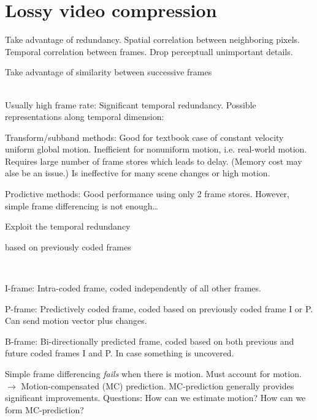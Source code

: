 \section{Lossy video compression}
Take advantage of redundancy. Spatial correlation between neighboring pixels. Temporal correlation between frames. Drop perceptuall unimportant details.
\begin{compactdesc}
	\item[\lp{Temporal Redundancy}] Take advantage of similarity between successive frames
	\item[\lp{Temporal processing}]\hfill\\
			Usually high frame rate: Significant temporal redundancy. Possible representations along temporal dimension:\hfill\\
		\begin{enumerate*}[label=\protect\circled{\arabic*},itemjoin=]
			\item Transform/subband methods: Good for textbook case of constant velocity uniform global motion. Inefficient for nonuniform motion, i.e. real-world motion. Requires large number of frame stores which leads to delay. (Memory cost may alse be an issue.) Is ineffective for many scene changes or high motion.\\
			\item Prodictive methods: Good performance using only 2 frame stores. However, simple frame differencing is not enough\ldots
		\end{enumerate*}
	\item[\lp{Goal}] Exploit the temporal redundancy
	\item[\lp{Predict current frame}] based on previously coded frames
	\item[\lp{Types of coded frames:}]\hfill\\
		\begin{enumerate*}[label=\protect\circled{\arabic*},itemjoin=]
			\item I-frame: Intra-coded frame, coded independently of all other frames.\\
			\item P-frame: Predictively coded frame, coded based on previously coded frame I or P. Can send motion vector plus changes.\\
			\item B-frame: Bi-directionally predicted frame, coded based on both previous and future coded frames I and P. In case something is uncovered.
		\end{enumerate*}
	\item[\lp{Motion-compensated prediction}] Simple frame differencing \emph{fails} when there is motion. Must account for motion. $\to$ Motion-compensated (MC) prediction. MC-prediction generally provides significant improvements. Questions: How can we estimate motion? How can we form MC-prediction?

\end{compactdesc}
